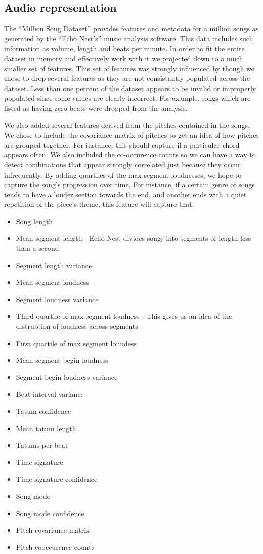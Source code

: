 \documentclass[a4paper,10pt]{article}
\begin{document}
\subsection{Audio representation}
The ``Million Song Dataset'' provides features and metadata for a million songs as generated by the ``Echo Nest's'' music analysis software. This data includes such information as volume, length and beats per minute. In order to fit the entire dataset in memory and effectively work with it we projected down to a much smaller set of features. This set of features was strongly influenced by \cite{Slaney_learninga} though we chose to drop several features as they are not consistantly populated across the dataset. Less than one percent of the dataset appears to be invalid or improperly populated since some values are clearly incorrect. For example. songs which are listed as having zero beats were dropped from the analysis. 

We also added several features derived from the pitches contained in the songs. We chose to include the covariance matrix of pitches to get an idea of how pitches are grouped together. For instance, this should capture if a particular chord appears often. We also included the co-occurence counts so we can have a way to detect combinations that appear strongly correlated just because they occur infrequently. By adding quartiles of the max segment loudnesses, we hope to capture the song's progression over time. For instance, if a certain genre of songs tends to have a louder section towards the end, and another ends with a quiet repetition of the piece's theme, this feature will capture that.

\begin{itemize}
 \item Song length 
 \item Mean segment length - Echo Nest divides songs into segments of length less than a second
 \item Segment length variance
 \item Mean segment loudness
 \item Segment loudness variance
 \item Third quartile of max segment loudness - This gives us an idea of the distrubtion of loudness across segments
 \item First quartile of max segment loundess
 \item Mean segment begin loudness
 \item Segment begin loudness variance
 \item Beat interval variance
 \item Tatum confidence
 \item Mean tatum length
 \item Tatums per beat
 \item Time signature
 \item Time signature confidence
 \item Song mode
 \item Song mode confidence
 \item Pitch covariance matrix
 \item Pitch cooccurence counts
\end{itemize}
\end{document}
